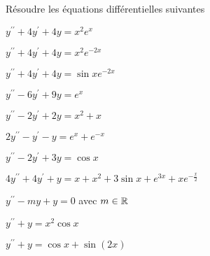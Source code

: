 \documentclass[a4paper, 11pt,reqno]{article}
\begin{document}




\begin{exercice}  \;
  R\'esoudre les \'equations diff\'erentielles suivantes
  \begin{enumerate}
    \begin{minipage}[c]{0.45\linewidth}
      \item $y^{\prime\prime}+4y^{\prime}+4y=x^2e^x$
      \item $y^{\prime\prime}+4y^{\prime}+4y=x^2e^{-2x}$
      \item $y^{\prime\prime}+4y^{\prime}+4y=\sin{x}e^{-2x}$
      \item $y^{\prime\prime}-6y^{\prime}+9y=e^x$
      \item $y^{\prime\prime}-2y^{\prime}+2y=x^2+x$
      \item $2y^{\prime\prime}-y^{\prime}-y=e^x+e^{-x}$
    \end{minipage}
    \begin{minipage}[c]{0.45\linewidth}
      \item $y^{\prime\prime}-2y^{\prime}+3y=\cos{x}$
      \item $4y^{\prime\prime}+4y^{\prime}+y=x+x^2+3\sin{x}+e^{3x}+xe^{-\frac{x}{2}}$
      \item $y^{\prime\prime}-my+y=0$ avec $m\in\mathbb{R}$
      \item $y^{\prime\prime}+y=x^2\cos{x}$
      \item $y^{\prime\prime}+y=\cos{x}+\sin{(2x)}$
    \end{minipage}
  \end{enumerate}
\end{exercice}
\end{document}

